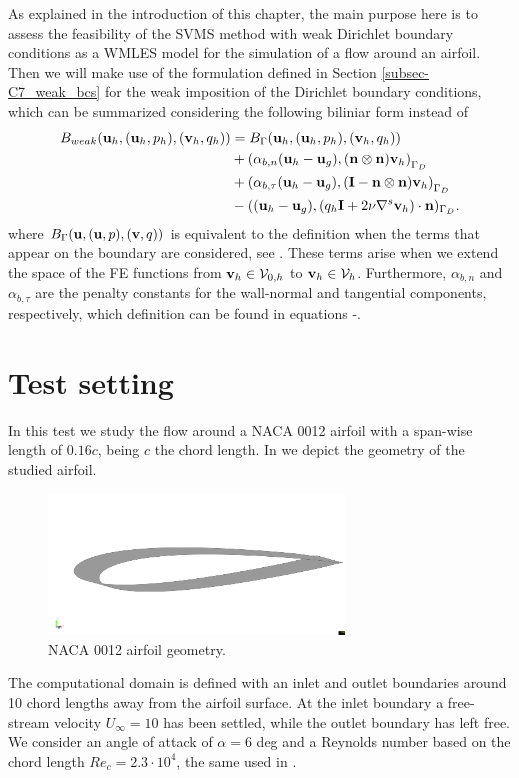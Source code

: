 As explained in the introduction of this chapter, the main purpose here is to assess the feasibility of the SVMS method with weak Dirichlet boundary conditions as a WMLES model for the simulation of a flow around an airfoil. Then we will make use of the formulation defined in Section \ref{subsec-C7_weak_bcs} for the weak imposition of the Dirichlet boundary conditions, which can be summarized considering the following biliniar form instead of 
\begin{align}
\label{eq-C8_bilinear_weak_by_components}
B_{weak}({\bf u}_h,({\bf u}_h,p_h),({\bf v}_h,q_h))&=B_\Gamma({\bf u}_h,({\bf u}_h,p_h),({\bf v}_h,q_h))\\\nonumber
&+\left(\alpha_{b,n}({\bf u}_h-{\bf u}_g),({\bf n}\otimes{\bf n}){\bf v}_h\right)_{\Gamma_D}\\\nonumber
&+\left(\alpha_{b,\tau}({\bf u}_h-{\bf u}_g),(\mathbf{I}-{\bf n}\otimes{\bf n}){\bf v}_h\right)_{\Gamma_D}\\\nonumber
&-(({\bf u}_h-{\bf u}_g),(q_h\mathbf{I}+2\nu\nabla^s{\bf v}_h)\cdot{\bf n})_{\Gamma_D}.
\end{align}
where $ B_\Gamma({\bf u},({\bf u},p),({\bf v},q)) $ is equivalent to the definition  when the terms that appear on the boundary are considered, see . These terms arise when we extend the space of the FE functions from $ {\bf v}_h\in\mathcal{V}_{0,h} $ to $ {\bf v}_h\in\mathcal{V}_h $. Furthermore, $ \alpha_{b,n} $ and $ \alpha_{b,\tau} $ are the penalty constants for the wall-normal and tangential components, respectively, which definition can be found in equations -.

\section{Test setting}
\label{sec-C8_setting}
In this test we study the flow around a NACA 0012 airfoil with a span-wise length of $ 0.16c $, being $ c $ the chord length. In  we depict the geometry of the studied airfoil.
\begin{figure}[h!]
  \centering
  \includegraphics[width=0.7\textwidth,clip=true,trim=5cm 8cm 1cm 8cm]{Figures/Chapter8/geometry_3d}
  \caption{NACA 0012 airfoil geometry.}
  \label{fig-NACA_geometry}
\end{figure}
The computational domain is defined with an inlet and outlet boundaries around 10 chord lengths away from the airfoil surface. At the inlet boundary a free-stream velocity $U_\infty=10$ has been settled, while the outlet boundary has left free. We consider an angle of attack of $ \alpha = 6 $ deg and a Reynolds number based on the chord length $ Re_c=2.3\cdot10^4 $, the same used in \cite{kojima_large-eddy_2013,_boundary_????}.

